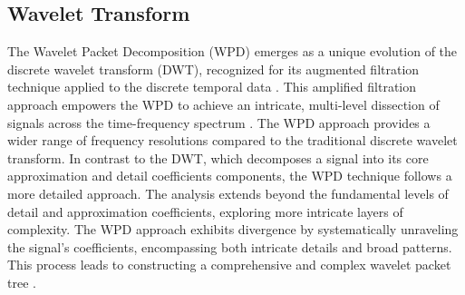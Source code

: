 {\subsection{Wavelet Transform}
The Wavelet Packet Decomposition (WPD) emerges as a unique evolution of the discrete wavelet transform (DWT), recognized for its augmented filtration technique applied to the discrete temporal data \cite{yen2000wavelet}. This amplified filtration approach empowers the WPD to achieve an intricate, multi-level dissection of signals across the time-frequency spectrum \cite{hu2011feature}. The WPD approach provides a wider range of frequency resolutions compared to the traditional discrete wavelet transform. In contrast to the DWT, which decomposes a signal into its core approximation and detail coefficients components, the WPD technique follows a more detailed approach. The analysis extends beyond the fundamental levels of detail and approximation coefficients, exploring more intricate layers of complexity. The WPD approach exhibits divergence by systematically unraveling the signal's coefficients, encompassing both intricate details and broad patterns. This process leads to constructing a comprehensive and complex wavelet packet tree \cite{zhang2017classification}.

}

